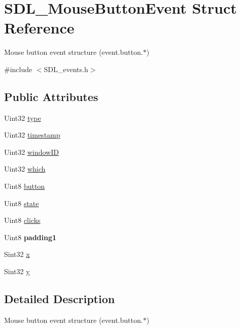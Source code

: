\hypertarget{structSDL__MouseButtonEvent}{}\section{S\+D\+L\+\_\+\+Mouse\+Button\+Event Struct Reference}
\label{structSDL__MouseButtonEvent}


Mouse button event structure (event.\+button.$\ast$)  




{\ttfamily \#include $<$S\+D\+L\+\_\+events.\+h$>$}

\subsection*{Public Attributes}
\begin{DoxyCompactItemize}
\item 
Uint32 \hyperlink{structSDL__MouseButtonEvent_af64cb09ea68b8081ecc8ee498552e3d7}{type}
\item 
Uint32 \hyperlink{structSDL__MouseButtonEvent_ab05e8a454692608ff56c502e95799c56}{timestamp}
\item 
Uint32 \hyperlink{structSDL__MouseButtonEvent_ab3b855d4b543b5d02fcf5d56e4421393}{window\+ID}
\item 
Uint32 \hyperlink{structSDL__MouseButtonEvent_a366aef59a0f393afc8a3561e741825df}{which}
\item 
Uint8 \hyperlink{structSDL__MouseButtonEvent_a1a4680e19ae06d02d2093f0bcba1b24c}{button}
\item 
Uint8 \hyperlink{structSDL__MouseButtonEvent_a8809cef85cfffad4f2059f2ba4fc6a3d}{state}
\item 
Uint8 \hyperlink{structSDL__MouseButtonEvent_aa606bebcbc3ffc7e932016039c2a36a1}{clicks}
\item 
\mbox{\label{structSDL__MouseButtonEvent_a765957d218d16fa00558fa4d20e80689}} 
Uint8 {\bfseries padding1}
\item 
Sint32 \hyperlink{structSDL__MouseButtonEvent_a5bb9c61b86e999f58637511e32e3a076}{x}
\item 
Sint32 \hyperlink{structSDL__MouseButtonEvent_a7ccb5c55a7ddadce723f4ea6d5269540}{y}
\end{DoxyCompactItemize}


\subsection{Detailed Description}
Mouse button event structure (event.\+button.$\ast$) 

